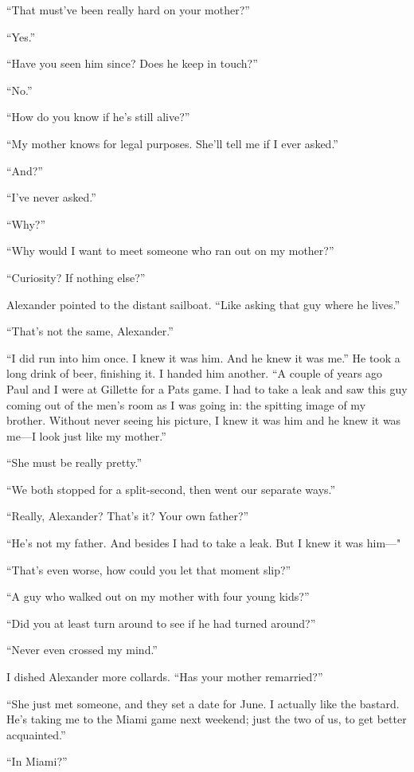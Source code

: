 ``That must've been really hard on your mother?''

``Yes.''

``Have you seen him since? Does he keep in touch?''

``No.''

``How do you know if he's still alive?''

``My mother knows for legal purposes. She'll tell me if I ever asked.''

``And?''

``I've never asked.''

``Why?''

``Why would I want to meet someone who ran out on my mother?''

``Curiosity? If nothing else?''

Alexander pointed to the distant sailboat. ``Like asking that guy where
he lives.''

``That's not the same, Alexander.''

``I did run into him once. I knew it was him. And he knew it was me.''
He took a long drink of beer, finishing it. I handed him another. ``A
couple of years ago Paul and I were at Gillette for a Pats game. I had
to take a leak and saw this guy coming out of the men's room as I was
going in: the spitting image of my brother. Without never seeing his
picture, I knew it was him and he knew it was me---I look just like my
mother.''

``She must be really pretty.''

``We both stopped for a split-second, then went our separate ways.''

``Really, Alexander? That's it? Your own father?''

``He's not my father. And besides I had to take a leak. But I knew it
was him---"

``That's even worse, how could you let that moment slip?''

``A guy who walked out on my mother with four young kids?''

``Did you at least turn around to see if he had turned around?''

``Never even crossed my mind.''

I dished Alexander more collards. ``Has your mother remarried?''

``She just met someone, and they set a date for June. I actually like
the bastard. He's taking me to the Miami game next weekend; just the two
of us, to get better acquainted.''

``In Miami?''

